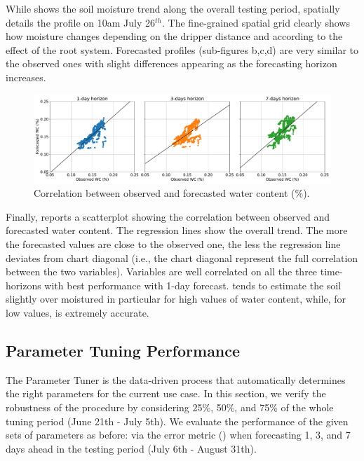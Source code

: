 While  shows the soil moisture trend along the overall testing period,  spatially details the profile on 10am July 26$^{th}$. The fine-grained spatial grid clearly shows how moisture changes depending on the dripper distance and according to the effect of the root system.
%
Forecasted profiles (sub-figures b,c,d) are very similar to the observed ones with slight differences appearing as the forecasting horizon increases.
\begin{figure}[t]
    \centering
    \includegraphics[scale=.27]{chapters/physics-aware/orchard/img/correlation_wc.pdf}
    \caption{Correlation between observed and forecasted  water content ($\%$).}
    \label{orchard-fig:scatter_correlation}
\end{figure}

Finally,  reports a scatterplot showing the correlation between observed and forecasted water content.
%
The regression lines show the overall trend.
%
The more the forecasted values are close to the observed one, the less the regression line deviates from chart diagonal (i.e., the chart diagonal represent the full correlation between the two variables). Variables are well correlated on all the three time-horizons with best performance with 1-day forecast.
%
\olab{} tends to estimate the soil slightly over moistured in particular for high values of water content, while, for low values, \olab{} is extremely accurate.

\subsection{Parameter Tuning Performance}
\label{orchard-ssec:eval_tuner}

The Parameter Tuner is the data-driven process that automatically determines the right parameters for the current use case.
%
In this section, we verify the robustness of the procedure
by considering 25\%, 50\%, and 75\% of the whole tuning period (June 21th - July 5th).
%
We evaluate the performance of the given sets of parameters as before: via the error metric () when forecasting 1, 3, and 7 days ahead in the testing period (July 6th - August 31th).

